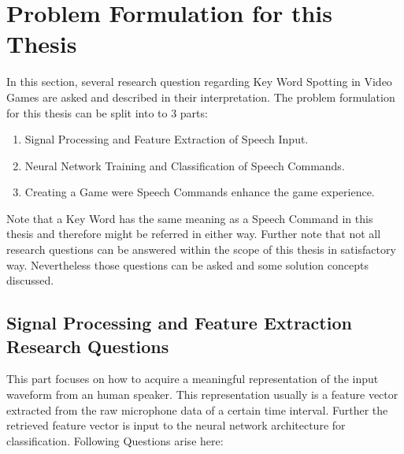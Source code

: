 
\section{Problem Formulation for this Thesis}\label{sec:intro_rq}
\thesisStateRevised
In this section, several research question regarding Key Word Spotting in Video Games are asked and described in their interpretation.
The problem formulation for this thesis can be split into to 3 parts:

\begin{enumerate}[label={Q.\arabic*)}, leftmargin=1.4cm]
    \item Signal Processing and Feature Extraction of Speech Input.
    \item Neural Network Training and Classification of Speech Commands.
    \item Creating a Game were Speech Commands enhance the game experience.
\end{enumerate}
Note that a Key Word has the same meaning as a Speech Command in this thesis and therefore might be referred in either way.
Further note that not all research questions can be answered within the scope of this thesis in satisfactory way.
Nevertheless those questions can be asked and some solution concepts discussed.

\subsection{Signal Processing and Feature Extraction Research Questions}\label{sec:intro_rq_signal}
This part focuses on how to acquire a meaningful representation of the input waveform from an human speaker. This representation usually is a feature vector extracted from the raw microphone data of a certain time interval. Further the retrieved feature vector is input to the neural network architecture for classification. Following Questions arise here:

